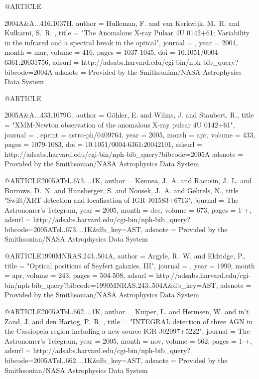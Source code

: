 {{{{{{{{{{{{{{@ARTICLE{2004A&A...416.1037H,
   author = {{Hulleman}, F. and {van Kerkwijk}, M.~H. and {Kulkarni}, S.~R.
	},
    title = "{The Anomalous X-ray Pulsar 4U 0142+61: Variability in the infrared and a spectral break in the optical}",
  journal = {\aap},
     year = 2004,
    month = mar,
   volume = 416,
    pages = {1037-1045},
      doi = {10.1051/0004-6361:20031756},
   adsurl = {http://adsabs.harvard.edu/cgi-bin/nph-bib_query?bibcode=2004A%
  adsnote = {Provided by the Smithsonian/NASA Astrophysics Data System}
}



@ARTICLE{2005A&A...433.1079G,
   author = {{G{\"o}hler}, E. and {Wilms}, J. and {Staubert}, R.},
    title = "{XMM-Newton observation of the anomalous X-ray pulsar 4U 0142+61}",
  journal = {\aap},
   eprint = {astro-ph/0409764},
     year = 2005,
    month = apr,
   volume = 433,
    pages = {1079-1083},
      doi = {10.1051/0004-6361:20042101},
   adsurl = {http://adsabs.harvard.edu/cgi-bin/nph-bib_query?bibcode=2005A%
  adsnote = {Provided by the Smithsonian/NASA Astrophysics Data System}
}



@ARTICLE{2005ATel..673....1K,
   author = {{Kennea}, J.~A. and {Racusin}, J.~L. and {Burrows}, D.~N. and 
	{Hunsberger}, S. and {Nousek}, J.~A. and {Gehrels}, N.},
    title = "{Swift/XRT detection and localization of IGR J01583+6713}",
  journal = {The Astronomer's Telegram},
     year = 2005,
    month = dec,
   volume = 673,
    pages = {1-+},
   adsurl = {http://adsabs.harvard.edu/cgi-bin/nph-bib_query?bibcode=2005ATel..673....1K&db_key=AST},
  adsnote = {Provided by the Smithsonian/NASA Astrophysics Data System}
}



@ARTICLE{1990MNRAS.243..504A,
   author = {{Argyle}, R.~W. and {Eldridge}, P.},
    title = "{Optical positions of Seyfert galaxies. III}",
  journal = {\mnras},
     year = 1990,
    month = apr,
   volume = 243,
    pages = {504-508},
   adsurl = {http://adsabs.harvard.edu/cgi-bin/nph-bib_query?bibcode=1990MNRAS.243..504A&db_key=AST},
  adsnote = {Provided by the Smithsonian/NASA Astrophysics Data System}
}



@ARTICLE{2005ATel..662....1K,
   author = {{Kuiper}, L. and {Hermsen}, W. and {in't Zand}, J. and {den Hartog}, P.~R.
	},
    title = "{INTEGRAL detection of three AGN in the Cassiopeia region including a new source IGR J02097+5222}",
  journal = {The Astronomer's Telegram},
     year = 2005,
    month = nov,
   volume = 662,
    pages = {1-+},
   adsurl = {http://adsabs.harvard.edu/cgi-bin/nph-bib_query?bibcode=2005ATel..662....1K&db_key=AST},
  adsnote = {Provided by the Smithsonian/NASA Astrophysics Data System}
}



}}}}}}}}}}}}}}}}
